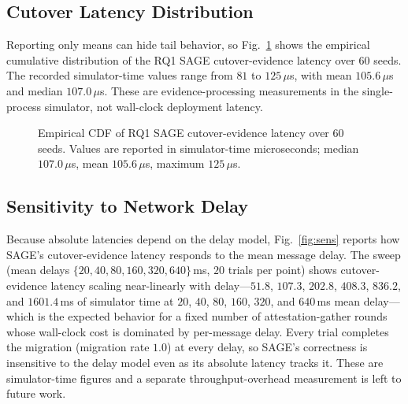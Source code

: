 \documentclass[journal]{IEEEtran}
\theoremstyle{definition}
\theoremstyle{remark}
\begin{document}
\subsection{Cutover Latency Distribution}
Reporting only means can hide tail behavior, so Fig.~\ref{fig:cdf} shows the empirical
cumulative distribution of the RQ1 SAGE cutover-evidence latency over $60$ seeds. The
recorded simulator-time values range from $81$ to $125\,\mu$s, with mean $105.6\,\mu$s and median
$107.0\,\mu$s. These are evidence-processing measurements in the
single-process simulator, not wall-clock deployment latency.

\begin{figure}[t]
\centering
{}
\caption{Empirical CDF of RQ1 SAGE cutover-evidence latency over $60$ seeds. Values are
reported in simulator-time microseconds; median $107.0\,\mu$s, mean $105.6\,\mu$s, maximum
$125\,\mu$s.}
\label{fig:cdf}
\end{figure}

\subsection{Sensitivity to Network Delay}
Because absolute latencies depend on the delay model, Fig.~\ref{fig:sens} reports how SAGE's
cutover-evidence latency responds to the mean message delay. The sweep
(mean delays $\{20,40,80,160,320,640\}\,$ms, $20$ trials per point)
shows cutover-evidence latency scaling near-linearly with delay---$51.8$, $107.3$, $202.8$, $408.3$,
$836.2$, and $1601.4\,$ms of simulator time at $20$, $40$, $80$, $160$, $320$, and $640\,$ms mean delay---which is the
expected behavior for a fixed number of attestation-gather rounds whose wall-clock cost is
dominated by per-message delay. Every trial completes the migration (migration rate $1.0$) at
every delay, so SAGE's correctness is insensitive to the delay model even as its absolute latency
tracks it. These are simulator-time figures and a separate throughput-overhead measurement is
left to future work.
\end{document}
